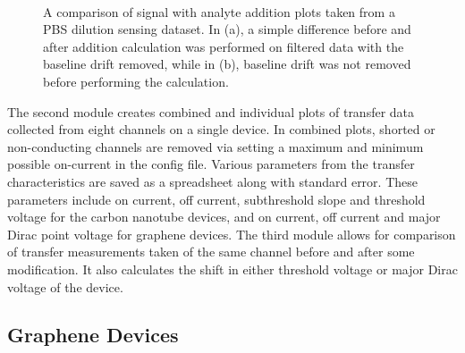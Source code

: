 \documentclass[
  a4paper,
]{scrbook}
\begin{document}
\begin{figure}
\begin{minipage}[t]{0.01\linewidth}
{\centering 

~

}

\end{minipage}%

\caption{\label{fig-spaa-plot-comparison}A comparison of signal with
analyte addition plots taken from a PBS dilution sensing dataset. In
(a), a simple difference before and after addition calculation was
performed on filtered data with the baseline drift removed, while in
(b), baseline drift was not removed before performing the calculation.}

\end{figure}

The second module creates combined and individual plots of transfer data
collected from eight channels on a single device. In combined plots,
shorted or non-conducting channels are removed via setting a maximum and
minimum possible on-current in the config file. Various parameters from
the transfer characteristics are saved as a spreadsheet along with
standard error. These parameters include on current, off current,
subthreshold slope and threshold voltage for the carbon nanotube
devices, and on current, off current and major Dirac point voltage for
graphene devices. The third module allows for comparison of transfer
measurements taken of the same channel before and after some
modification. It also calculates the shift in either threshold voltage
or major Dirac voltage of the device.

\hypertarget{graphene-devices}{%
\subsection{Graphene Devices}\label{graphene-devices}}
\end{document}
